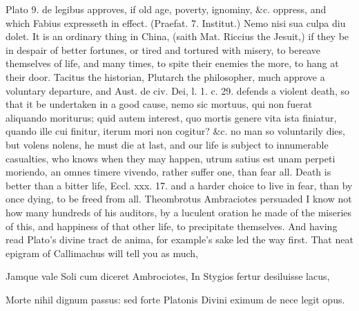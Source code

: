 Plato 9. de legibus approves, if old age, poverty, ignominy, \&c.
oppress, and which Fabius expresseth in effect. (Praefat. 7. Institut.)
Nemo nisi sua culpa diu dolet. It is an ordinary thing in China, (saith
Mat. Riccius the Jesuit,) if they be in despair of better
fortunes, or tired and tortured with misery, to bereave themselves of
life, and many times, to spite their enemies the more, to hang at their
door. Tacitus the historian, Plutarch the philosopher, much approve a
voluntary departure, and Aust. de civ. Dei, l. 1. c. 29. defends a
violent death, so that it be undertaken in a good cause, nemo sic
mortuus, qui non fuerat aliquando moriturus; quid autem interest, quo
mortis genere vita ista finiatur, quando ille cui finitur, iterum mori
non cogitur? \&c. no man so voluntarily dies, but volens nolens,
he must die at last, and our life is subject to innumerable casualties,
who knows when they may happen, utrum satius est unam perpeti moriendo,
an omnes timere vivendo,  rather suffer one, than fear all. Death
is better than a bitter life, Eccl. xxx. 17. and a harder choice
to live in fear, than by once dying, to be freed from all. Theombrotus
Ambraciotes persuaded I know not how many hundreds of his auditors, by
a luculent oration he made of the miseries of this, and happiness of
that other life, to precipitate themselves. And having read Plato's
divine tract de anima, for example's sake led the way first. That neat
epigram of Callimachus will tell you as much,

Jamque vale Soli cum diceret Ambrociotes,
In Stygios fertur desiluisse lacus,

Morte nihil dignum passus: sed forte Platonis
Divini eximum de nece legit opus.

